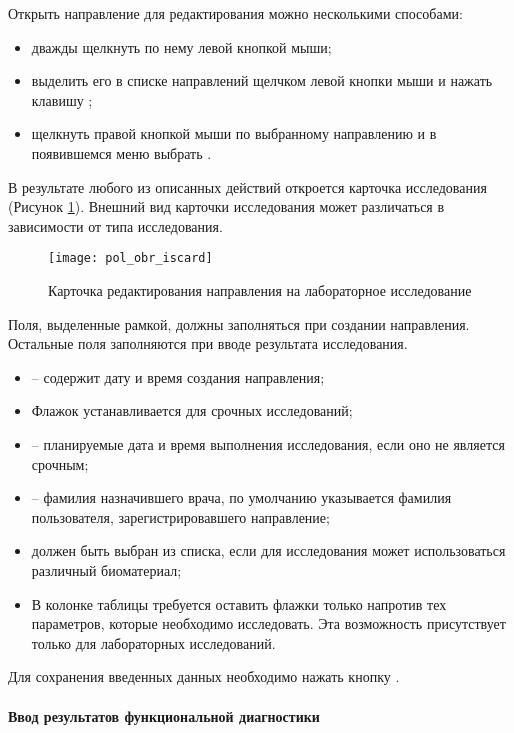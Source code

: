 Открыть направление для редактирования можно несколькими способами:
\begin{itemize}
 \item дважды щелкнуть по нему левой кнопкой мыши;
 \item выделить его в списке направлений щелчком левой кнопки мыши и нажать клавишу ;
 \item щелкнуть правой кнопкой мыши по выбранному направлению и в появившемся меню выбрать .
\end{itemize}

В результате любого из описанных действий откроется карточка исследования (Рисунок \ref{img_pol_obr_iscard}). Внешний вид карточки исследования может различаться в зависимости от типа исследования.

 \begin{figure}[ht]\centering
   \texttt{[image: pol\_obr\_iscard]}
   \caption{Карточка редактирования направления на лабораторное исследование}
   \label{img_pol_obr_iscard}
 \end{figure} 
 
Поля, выделенные рамкой, должны заполняться при создании направления. Остальные поля заполняются при вводе результата исследования.
\begin{itemize}
 \item {} – содержит дату и время создания направления;
 \item Флажок  устанавливается для срочных исследований;
 \item {} – планируемые дата и время выполнения исследования, если оно не является срочным;
 \item {} – фамилия назначившего врача, по умолчанию указывается фамилия пользователя, зарегистрировавшего направление;
 \item {} должен быть выбран из списка, если для исследования может использоваться различный биоматериал;
 \item В колонке  таблицы требуется оставить флажки только напротив тех параметров, которые необходимо исследовать. Эта возможность присутствует только для лабораторных исследований.
\end{itemize}
 
Для сохранения введенных данных необходимо нажать кнопку .

\paragraph{Ввод результатов функциональной диагностики} \label{pol_obr_isrez}

